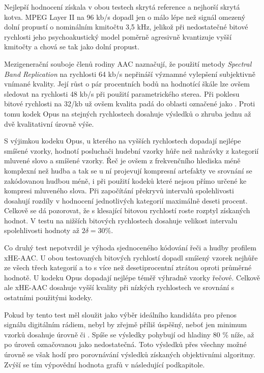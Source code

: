 Nejlepší hodnocení získala v obou testech skrytá reference a nejhorší skrytá kotva. MPEG Layer II na 96 kb/s dopadl jen o málo lépe než signál omezený dolní propustí o nominálním kmitočtu 3,5 kHz, jelikož při nedostatečné bitové rychlosti jeho psychoakustický model poměrně agresivně kvantizuje vyšší kmitočty a chová se tak jako dolní propust.

Mezigenerační souboje členů rodiny AAC naznačují, že použití metody \textit{Spectral Band Replication} na rychlosti 64 kb/s nepřináší významné vylepšení subjektivně vnímané kvality. Její růst o pár procentních bodů na hodnotící škále lze ovšem sledovat na rychlosti 48 kb/s při použití parametrického sterea. Při poklesu bitové rychlosti na 32/kb už ovšem kvalita padá do oblasti označené jako . Proti tomu kodek Opus na stejných rychlostech dosahuje výsledků o zhruba jednu až dvě kvalitativní úrovně výše.

S výjimkou kodeku Opus, u kterého na vyšších rychlostech dopadají nejlépe smíšené vzorky, hodnotí posluchači hudební vzorky hůře než nahrávky z kategorií mluvené slovo a smíšené vzorky. Řeč je ovšem z frekvenčního hlediska méně komplexní než hudba a tak se u ní projevují kompresní artefakty ve srovnání se zakódovanou hudbou méně, i při použití kodeků které nejsou přímo určené ke kompresi mluveného slova. Při započítání překryvů intervalů spolehlivosti dosahují rozdíly v hodnocení jednotlivých kategorií maximálně deseti procent. Celkově se dá pozorovat, že s klesající bitovou rychlostí roste rozptyl získaných hodnot. V testu na nižších bitových rychlostech dosahuje velikost intervalu spolehlivosti hodnoty až $ 2\delta = 30 \%$.

Co druhý test nepotvrdil je výhoda sjednoceného kódování řeči a hudby profilem xHE-AAC. U obou testovaných bitových rychlostí dopadl smíšený vzorek nejhůře ze všech třech kategorií a to s více než desetiprocentní ztrátou oproti průměrné hodnotě. U kodeku Opus dopadají nejlépe téměř výhradně vzorky řečové. Celkově ale xHE-AAC dosahuje vyšší kvality při nízkých rychlostech ve srovnání s ostatními použitými kodeky.

Pokud by tento test měl sloužit jako výběr ideálního kandidáta pro přenos signálu digitálním rádiem, nebyl by zřejmě příliš úspěšný, neboť jen minimum vzorků dosahuje úrovně  či . Spíše se výsledky pohybují od hladiny 80 \% níže, až po úroveň označovanou jako nedostatečná. Toto  výsledků přes všechny možné úrovně se však hodí pro porovnávání výsledků získaných objektivními algoritmy. Zvýší se tím výpovědní hodnota grafů v následující podkapitole.


